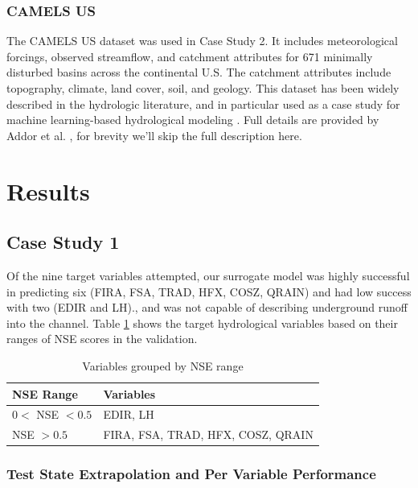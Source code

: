 \documentclass{article}
\begin{document}
\subsubsection{CAMELS US}
The CAMELS US dataset was used in Case Study 2. It includes meteorological forcings, observed streamflow, and catchment attributes for 671 minimally disturbed basins across the continental U.S. The catchment attributes include topography, climate, land cover, soil, and geology. This dataset has been widely described in the hydrologic literature, and in particular used as a case study for machine learning-based hydrological modeling \cite{Kratzert2018lstm, Kratzert2019pub, feng2022differentiable, Feng2022, frame2022extreme}. Full details are provided by Addor et al. \cite{addor2017camels}, for brevity we'll skip the full description here.

\section{Results}
\label{sec:results}

\subsection{Case Study 1}
\label{sec:case1}

Of the nine target variables attempted, our surrogate model was highly successful in predicting six (FIRA, FSA, TRAD, HFX, COSZ, QRAIN) and had low success with two (EDIR and LH)., and was not capable of describing underground runoff into the channel. Table \ref{tab:variable_nse_ranges} shows the target hydrological variables based on their ranges of NSE scores in the validation.

\begin{table}[htbp]
    \centering
    \caption{Variables grouped by NSE range}
    \begin{tabular}{ll}
        \toprule
        NSE Range & Variables \\
        \midrule
        $0 < $ NSE $< 0.5$ & EDIR, LH \\
        NSE $> 0.5$ & FIRA, FSA, TRAD, HFX, COSZ, QRAIN \\
        \bottomrule
    \end{tabular}
    \label{tab:variable_nse_ranges}
\end{table}

\subsubsection{Test State Extrapolation and Per Variable Performance}
\end{document}
